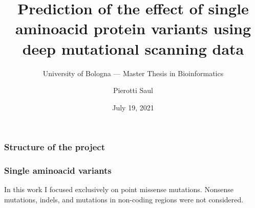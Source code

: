\documentclass[10pt, british]{beamer}
\title[Single aminoacid variants prediction]{Prediction of the effect of single aminoacid protein
	variants using deep mutational scanning data}
\subtitle[]{University of Bologna --- Master Thesis in Bioinformatics}
\author[Pierotti Saul]{Pierotti Saul}
\date{July 19, 2021}
\begin{document}
\begin{frame}[plain]
	\titlepage%
\end{frame}

\begin{frame}
	\frametitle{Structure of the project}
	\begin{figure}
		
	\end{figure}
\end{frame}

\begin{frame}
	\frametitle{Single aminoacid variants}
	In this work I focused exclusively on point missense mutations.
	Nonsense mutations, indels, and mutations in non-coding regions were not considered.

	\vfill
	\begin{figure}
		
	\end{figure}
\end{frame}
%
%
%
%
\end{document}
